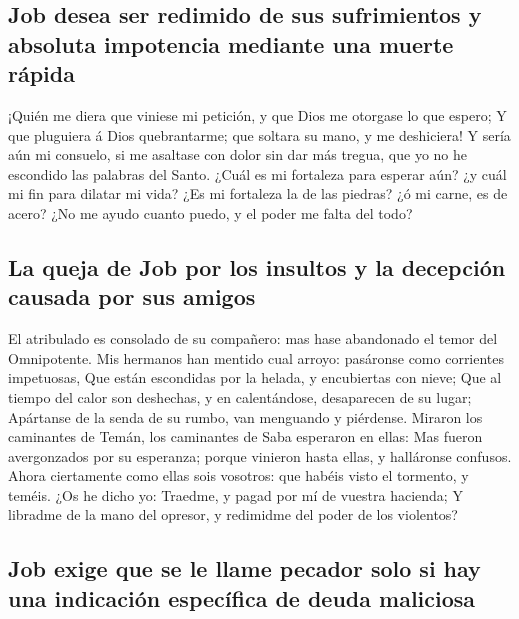 \hypertarget{job-desea-ser-redimido-de-sus-sufrimientos-y-absoluta-impotencia-mediante-una-muerte-ruxe1pida}{%
\subsection{Job desea ser redimido de sus sufrimientos y absoluta
impotencia mediante una muerte
rápida}\label{job-desea-ser-redimido-de-sus-sufrimientos-y-absoluta-impotencia-mediante-una-muerte-ruxe1pida}}

 ¡Quién me diera que viniese mi petición, y que Dios me
otorgase lo que espero;  Y que pluguiera á Dios
quebrantarme; que soltara su mano, y me deshiciera!  Y
sería aún mi consuelo, si me asaltase con dolor sin dar más tregua, que
yo no he escondido las palabras del Santo.  ¿Cuál es mi
fortaleza para esperar aún? ¿y cuál mi fin para dilatar mi vida?
 ¿Es mi fortaleza la de las piedras? ¿ó mi carne, es de
acero?  ¿No me ayudo cuanto puedo, y el poder me falta del
todo?

\hypertarget{la-queja-de-job-por-los-insultos-y-la-decepciuxf3n-causada-por-sus-amigos}{%
\subsection{La queja de Job por los insultos y la decepción causada por
sus
amigos}\label{la-queja-de-job-por-los-insultos-y-la-decepciuxf3n-causada-por-sus-amigos}}

 El atribulado es consolado de su compañero: mas hase
abandonado el temor del Omnipotente.  Mis hermanos han
mentido cual arroyo: pasáronse como corrientes impetuosas, 
Que están escondidas por la helada, y encubiertas con nieve;
 Que al tiempo del calor son deshechas, y en calentándose,
desaparecen de su lugar;  Apártanse de la senda de su
rumbo, van menguando y piérdense.  Miraron los caminantes
de Temán, los caminantes de Saba esperaron en ellas:  Mas
fueron avergonzados por su esperanza; porque vinieron hasta ellas, y
halláronse confusos.  Ahora ciertamente como ellas sois
vosotros: que habéis visto el tormento, y teméis.  ¿Os he
dicho yo: Traedme, y pagad por mí de vuestra hacienda;  Y
libradme de la mano del opresor, y redimidme del poder de los violentos?

\hypertarget{job-exige-que-se-le-llame-pecador-solo-si-hay-una-indicaciuxf3n-especuxedfica-de-deuda-maliciosa}{%
\subsection{Job exige que se le llame pecador solo si hay una indicación
específica de deuda
maliciosa}\label{job-exige-que-se-le-llame-pecador-solo-si-hay-una-indicaciuxf3n-especuxedfica-de-deuda-maliciosa}}


